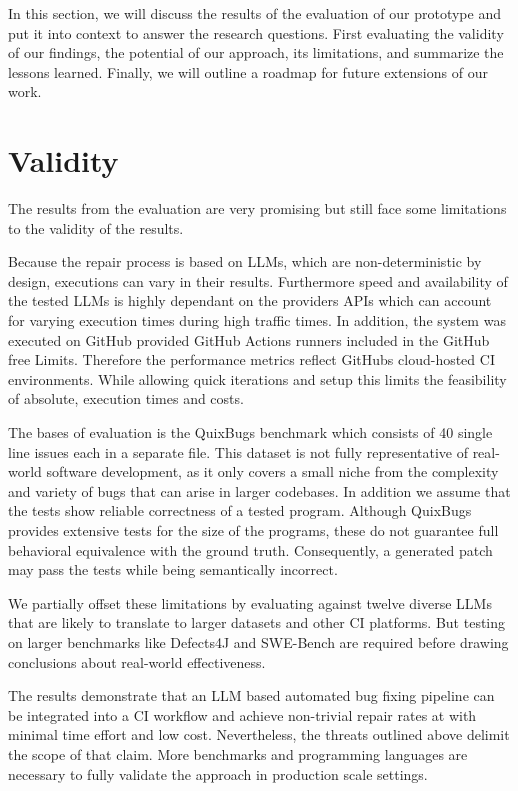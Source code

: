 In this section, we will discuss the results of the evaluation of our prototype and put it into context to answer the research questions. First evaluating the validity of our findings, the potential of our approach, its limitations, and summarize the lessons learned. Finally, we will outline a roadmap for future extensions of our work.

\section{Validity} \label{section:validity}
The results from the evaluation are very promising but still face some limitations to the validity of the results.

Because the repair process is based on LLMs, which are non-deterministic by design, executions can vary in their results. Furthermore speed and availability of the tested LLMs is highly dependant on the providers APIs which can account for varying execution times during high traffic times. In addition, the system was executed on GitHub provided GitHub Actions runners included in the GitHub free Limits. Therefore the performance metrics reflect GitHubs cloud-hosted CI environments. While allowing quick iterations and setup this limits the feasibility of absolute, execution times and costs.

The bases of evaluation is the QuixBugs benchmark which consists of 40 single line issues each in a separate file. This dataset is not fully representative of real-world software development, as it only covers a small niche from the complexity and variety of bugs that can arise in larger codebases.
In addition we assume that the tests show reliable correctness of a tested program. Although QuixBugs provides extensive tests for the size of the programs, these do not guarantee full behavioral equivalence with the ground truth. Consequently, a generated patch may pass the tests while being semantically incorrect.

We partially offset these limitations by evaluating against twelve diverse LLMs that are likely to translate to larger datasets and other CI platforms. But testing on larger benchmarks like Defects4J and SWE-Bench are required before drawing conclusions about real-world effectiveness.

The results demonstrate that an LLM based automated bug fixing pipeline can be integrated into a CI workflow and achieve non-trivial repair rates at with minimal time effort and low cost.
Nevertheless, the threats outlined above delimit the scope of that claim. More benchmarks and programming languages are necessary to fully validate the approach in production scale settings.

